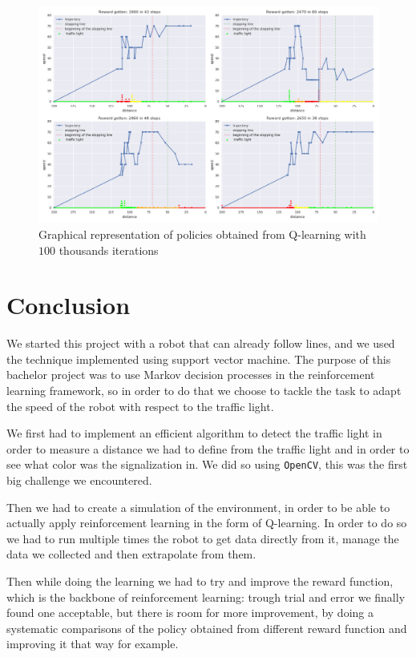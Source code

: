 \documentclass[14pt,a4paper]{article}
\theoremstyle{definition}
\begin{document}
\begin{figure}[H]
\centering
\includegraphics[scale=0.4]{img/traj1.png}
\caption{Graphical representation of  policies obtained from Q-learning with $100$ thousands  iterations}
\label{trajectories}
\end{figure}



\section{Conclusion}

We started this project with a robot that can already follow lines, and we used the technique implemented using support vector machine. The purpose of this bachelor project was to use Markov decision processes in the reinforcement learning framework, so in order to do that we choose to tackle the task to adapt the speed of the robot with respect to the traffic light.

We first had to implement an efficient algorithm to detect the traffic light in order to measure a distance we had to define from the traffic light and in order to see what color was the signalization in. We did so using \texttt{OpenCV}, this was the first big challenge we encountered.

Then we had to create a simulation of the environment, in order to be able to actually apply reinforcement learning in the form of Q-learning. In order to do so we had to run multiple times the robot to get data directly from it, manage the data we collected and then extrapolate from them.

Then while doing the learning we had to try and improve the reward function, which is the backbone of reinforcement learning: trough trial and error we finally found one acceptable, but there is room for more improvement, by doing a systematic comparisons of the policy obtained from different reward function and improving it that way for example.\\
\end{document}
